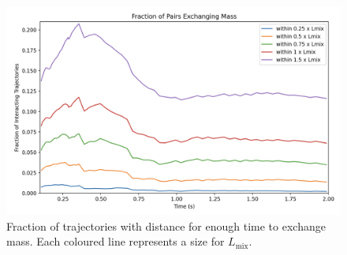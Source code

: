 \begin{figure}[htbp]
    \centering
    \includegraphics[width=\textwidth]{chapters/3/figures/frac_exchanging.png}
    \caption{Fraction of trajectories with distance for enough time to exchange mass. Each coloured line represents a size for $L_{\mathrm{mix}}$.
    \label{fig:frac_exchanging}}
\end{figure}